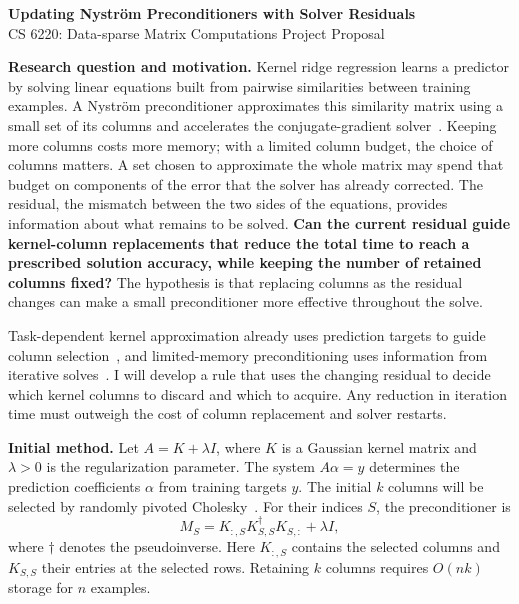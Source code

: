 \documentclass[11pt,letterpaper]{article}
\newcommand{\nystrom}{Nystr\"om}
\begin{document}
\fontsize{10.5}{12.3}\selectfont
\begin{center}
  {\large\bfseries Updating Nystr\"om Preconditioners with Solver Residuals}\\[3pt]
  CS 6220: Data-sparse Matrix Computations \quad Project Proposal
\end{center}
\vspace{-7pt}

\textbf{Research question and motivation.}
Kernel ridge regression learns a predictor by solving linear equations built from
pairwise similarities between training examples.
A \nystrom{} preconditioner approximates this similarity matrix using a small set
of its columns and accelerates the conjugate-gradient solver~\cite{frangella2023nystrom}.
Keeping more columns costs more memory; with a limited column budget, the choice
of columns matters. A set chosen to approximate the whole matrix may spend that
budget on components of the error that the solver has already corrected.
The residual, the mismatch between the two sides of the equations, provides
information about what remains to be solved.
\textbf{Can the current residual guide kernel-column replacements that reduce the
total time to reach a prescribed solution accuracy, while keeping the number of
retained columns fixed?}
The hypothesis is that replacing columns as the residual changes can make a
small preconditioner more effective throughout the solve.

Task-dependent kernel approximation already uses prediction targets to guide
column selection~\cite{bach2005predictive}, and limited-memory preconditioning
uses information from iterative solves~\cite{morales2000automatic}.
I will develop a rule that uses the changing residual to decide which kernel
columns to discard and which to acquire. Any reduction in iteration time must
outweigh the cost of column replacement and solver restarts.

\textbf{Initial method.}
Let $A=K+\lambda I$, where $K$ is a Gaussian kernel matrix and $\lambda>0$ is the
regularization parameter. The system $A\alpha=y$ determines the prediction
coefficients $\alpha$ from training targets $y$.
The initial $k$ columns will be selected by randomly pivoted
Cholesky~\cite{chen2025rpcholesky}. For their indices $S$, the preconditioner is
\[
 M_S=K_{:,S}K_{S,S}^{\dagger}K_{S,:}+\lambda I,
\]
where $\dagger$ denotes the pseudoinverse.
Here $K_{:,S}$ contains the selected columns and $K_{S,S}$ their entries at the
selected rows. Retaining $k$ columns requires $O(nk)$ storage for $n$ examples.
\end{document}
